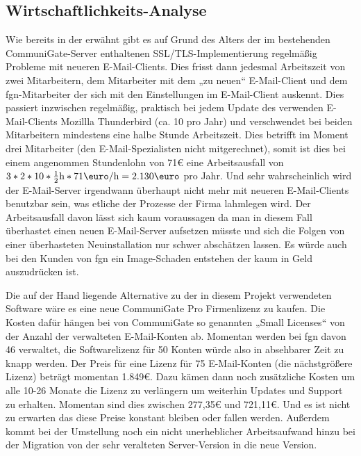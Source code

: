 \documentclass[11pt,a4paper,titlepage=firstiscover,headsepline,bibtotoc]{scrartcl} %
\begin{document}
\subsection{Wirtschaftlichkeits-Analyse}\label{sec:Erwin}
Wie bereits in der  erwähnt gibt es auf Grund des Alters der im bestehenden CommuniGate-Server enthaltenen SSL/TLS-Implementierung regelmäßig Probleme mit neueren E-Mail-Clients. Dies frisst dann jedesmal Arbeitszeit von zwei Mitarbeitern, dem Mitarbeiter mit dem „zu neuen“ E-Mail-Client und dem fgn-Mitarbeiter der sich mit den Einstellungen im E-Mail-Client auskennt. Dies passiert inzwischen regelmäßig, praktisch bei jedem Update des verwenden E-Mail-Clients Mozillla Thunderbird (ca. 10 pro Jahr) und verschwendet bei beiden Mitarbeitern mindestens eine halbe Stunde Arbeitszeit. Dies betrifft im Moment drei Mitarbeiter (den E-Mail-Spezialisten nicht mitgerechnet), somit ist dies bei einem angenommen Stundenlohn von 71\mbox{\euro} eine Arbeitsausfall von \(3*2*10*\frac{1}{2}\mbox{h}*71\mbox{\euro}/\mbox{h}=2.130\mbox{\euro}\) pro Jahr. Und sehr wahrscheinlich wird der E-Mail-Server irgendwann überhaupt nicht mehr mit neueren E-Mail-Clients benutzbar sein, was etliche der Prozesse der Firma lahmlegen wird. Der Arbeitsausfall davon lässt sich kaum voraussagen da man in diesem Fall überhastet einen neuen E-Mail-Server aufsetzen müsste und sich die Folgen von einer überhasteten Neuinstallation nur schwer abschätzen lassen. Es würde auch bei den Kunden von fgn ein Image-Schaden entstehen der kaum in Geld auszudrücken ist.

Die auf der Hand liegende Alternative zu der in diesem Projekt verwendeten Software wäre es eine neue CommuniGate Pro Firmenlizenz zu kaufen. Die Kosten dafür hängen bei von CommuniGate so genannten „Small Licenses“ von der Anzahl der verwalteten E-Mail-Konten ab. Momentan werden bei fgn davon 46 verwaltet, die Softwarelizenz für 50 Konten würde also in absehbarer Zeit zu knapp werden. Der Preis für eine Lizenz für 75 E-Mail-Konten (die nächstgrößere Lizenz) beträgt momentan 1.849\euro. Dazu kämen dann noch zusätzliche Kosten um alle 10-26 Monate die Lizenz zu verlängern um weiterhin Updates und Support zu erhalten. Momentan sind dies zwischen 277,35\euro{} und 721,11\euro. Und es ist nicht zu erwarten das diese Preise konstant bleiben oder fallen werden. Außerdem kommt bei der Umstellung noch ein nicht unerheblicher Arbeitsaufwand hinzu bei der Migration von der sehr veralteten Server-Version in die neue Version.
\end{document}

